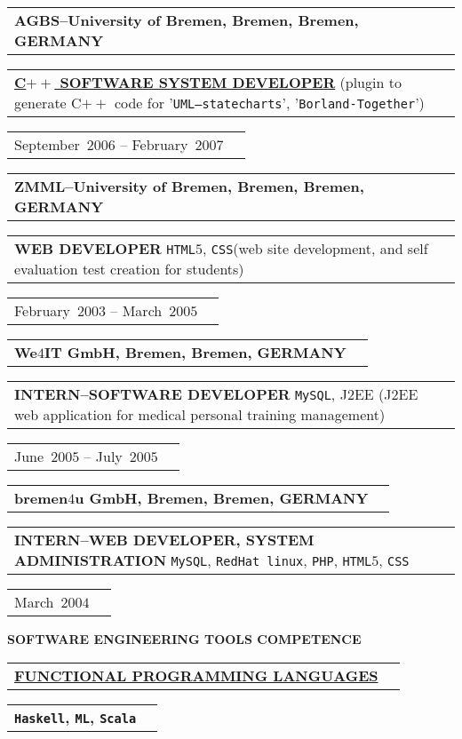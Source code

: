\documentclass[9pt,a4paper]{article} %
\makeatletter
\newcommand{\headerrow}[2]
{\begin{tabular*}{\linewidth}{l@{\extracolsep{\fill}}r}
	#1 &
	#2 \\
\end{tabular*}}
\newcommand{\headerrowONE}[1]{\headerrow{#1}{}}
\newcommand{\cplusplus}{C$++$\xspace}
\newcommand{\css}{\texttt{CSS}\xspace}
\newcommand{\html}{\texttt{HTML$5$}\xspace}
\newcommand{\jtwoee}{J$2$EE\xspace}
\newcommand{\php}{\texttt{PHP}\xspace}
\newcommand{\scala}{\texttt{Scala}\xspace}
\newcommand{\haskell}{\texttt{Haskell}\xspace}
\newcommand{\ml}{\texttt{ML}\xspace}
\newcommand{\mysql}{\texttt{MySQL}\xspace}
\newcommand{\redhat}{\texttt{RedHat~linux}\xspace}
\newcommand{\cvitemdate}[2]{#1~$#2$\xspace}
\newcommand{\cvitempositionheld}[1]{\textbf{#1}\xspace}
\makeatother
\begin{document}
\vspace{0.3em}

\headerrowONE{\textbf{AGBS--University of Bremen, Bremen, Bremen, GERMANY}}	
\headerrowONE{\href{http://www.informatik.uni-bremen.de/agbs/jp/papers/peleska_et_al_soqua2006.pdf}{\cvitempositionheld{\cplusplus SOFTWARE SYSTEM DEVELOPER}}
(plugin to generate \cplusplus code for '\texttt{UML--statecharts}',
'\texttt{Borland-Together}')}
\headerrowONE{\cvitemdate{September}{2006} -- \cvitemdate{February}{2007}}	

\vspace{0.3em}

\headerrowONE{\textbf{ZMML--University of Bremen, Bremen, Bremen, GERMANY}}	
\headerrowONE{\cvitempositionheld{WEB DEVELOPER} \html, \css (web site development,
and self evaluation test creation for students)}
\headerrowONE{\cvitemdate{February}{2003} -- \cvitemdate{March}{2005}}	

\vspace{0.3em}

\headerrowONE{\textbf{We$4$IT GmbH, Bremen, Bremen, GERMANY}}	
\headerrowONE{\cvitempositionheld{INTERN--SOFTWARE DEVELOPER} \mysql, \jtwoee
(\jtwoee web application for medical personal training management)}
\headerrowONE{\cvitemdate{June}{2005} -- \cvitemdate{July}{2005}}
	
\vspace{0.3em}

\headerrowONE{\textbf{bremen$4$u GmbH, Bremen, Bremen, GERMANY}}	
\headerrowONE{\cvitempositionheld{INTERN--WEB DEVELOPER, SYSTEM ADMINISTRATION} \mysql, \redhat, \php,
\html, \css}
\headerrowONE{\cvitemdate{March}{2004}}	

\vspace{2em}

\newpage


\vspace{0em}

\begin{center}
{\large \textbf{SOFTWARE ENGINEERING TOOLS COMPETENCE}}
\end{center}

\vspace{0.5em}

\headerrowONE{\textbf{\underline{FUNCTIONAL PROGRAMMING LANGUAGES}}}
\headerrowONE{\textbf{\textbf{\haskell}, \textbf{\ml}, \scala}}

\vspace{0.3em}
\end{document}
